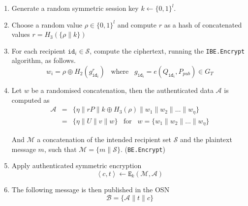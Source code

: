 \documentclass[journal]{IEEEtran}
\newcommand{\id}[1]{\ensuremath{\mathtt{id}_{#1}}}
\begin{document}
\begin{description}
    \begin{enumerate}
        \item Generate a random symmetric session key $k \leftarrow \{ 0,1 \}^{l}$.
        \item Choose a random value $\rho \in \{ 0,1 \}^{l}$ and compute $r$ as a hash of concatenated values $r = H_3 \left( \{ \rho \parallel k \} \right)$
        \item For each recipient $\id{i} \in \mathcal{S}$, compute the ciphertext, running the \texttt{IBE.Encrypt} algorithm, as follows.
            \begin{equation*}
                w_i = \rho \oplus H_2 \left( g_{\id{i}}^r \right) \; \; \; \textrm{where} \; \; \; g_{\id{i}} = e \left( Q_{\id{i}}, P_{pub} \right) \in G_T
            \end{equation*}
        \item Let $w$ be a randomised concatenation, then the authenticated data $\mathcal{A}$ is computed as                                  
        \begin{equation*}
                \begin{array}{lcl}
                    \mathcal{A} & = & \{ \eta \parallel rP \parallel k \oplus H_3 \left( \rho \right) \parallel w_1 \parallel w_2 \parallel \ldots \parallel w_\eta \} \\
                    & = & \{ \eta \parallel U \parallel v \parallel w \} \; \; \; \textrm{for} \; \; \; w = \{ w_1 \parallel w_2 \parallel \ldots \parallel w_\eta \}
                \end{array} 
            \end{equation*}
            
        And $\mathcal{M}$ a concatenation of the intended recipient set $\mathcal{S}$ and the plaintext message $m$, such that $\mathcal{M} = \{ m \parallel \mathcal{S} \}$. (\texttt{BE.Encrypt})
    
        \item Apply authenticated symmetric encryption
        \begin{equation*}
            \left< c, t \right> \leftarrow \mathtt{E}_k(\mathcal{M},\mathcal{A})
        \end{equation*}
        \item The following message is then published in the OSN
        \begin{equation*}
            \mathcal{B} = \{ \mathcal{A} \parallel t \parallel c \}
        \end{equation*}
    \end{enumerate}
    

\end{description}
\end{document}

